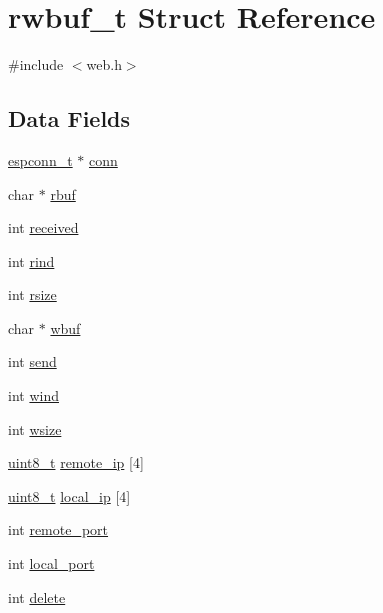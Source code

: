 \hypertarget{structrwbuf__t}{}\section{rwbuf\+\_\+t Struct Reference}
\label{structrwbuf__t}


{\ttfamily \#include $<$web.\+h$>$}

\subsection*{Data Fields}
\begin{DoxyCompactItemize}
\item 
\hyperlink{web_8h_a6dae30cd245bde804cf3e2c09e39a4b6}{espconn\+\_\+t} $\ast$ \hyperlink{structrwbuf__t_a15785240e32c27f7af7c4b0cb1a6e39b}{conn}
\item 
char $\ast$ \hyperlink{structrwbuf__t_afd83372241273849c9395d587b146021}{rbuf}
\item 
int \hyperlink{structrwbuf__t_ac76412a0fbf9dc009ae3f8bb20660883}{received}
\item 
int \hyperlink{structrwbuf__t_ad5cbf7a78a5f5d9aa75b38f90e0fb6af}{rind}
\item 
int \hyperlink{structrwbuf__t_aa4094c7e329ae85cc50dbd06d3b50d44}{rsize}
\item 
char $\ast$ \hyperlink{structrwbuf__t_a68386231f3d907ec4508c090925782a2}{wbuf}
\item 
int \hyperlink{structrwbuf__t_a279490994b6576ad00900254a8c07a89}{send}
\item 
int \hyperlink{structrwbuf__t_a135345eee44e93f37e57dbabec12c339}{wind}
\item 
int \hyperlink{structrwbuf__t_ac723cf150dd35d0f67ba7d38b18863ad}{wsize}
\item 
\hyperlink{send_8c_aba7bc1797add20fe3efdf37ced1182c5}{uint8\+\_\+t} \hyperlink{structrwbuf__t_ad83926198e358ac1a569b0da7749572c}{remote\+\_\+ip} \mbox{[}4\mbox{]}
\item 
\hyperlink{send_8c_aba7bc1797add20fe3efdf37ced1182c5}{uint8\+\_\+t} \hyperlink{structrwbuf__t_aa26b4813db79aeaa293bb1eadfde0b54}{local\+\_\+ip} \mbox{[}4\mbox{]}
\item 
int \hyperlink{structrwbuf__t_aace1e79a985cc8fab4c2093208bf3763}{remote\+\_\+port}
\item 
int \hyperlink{structrwbuf__t_aac758cef289d022f4eb81d4c4fac7f04}{local\+\_\+port}
\item 
int \hyperlink{structrwbuf__t_a54e278f96a331cf0a61d22094c4b9f87}{delete}
\end{DoxyCompactItemize}


